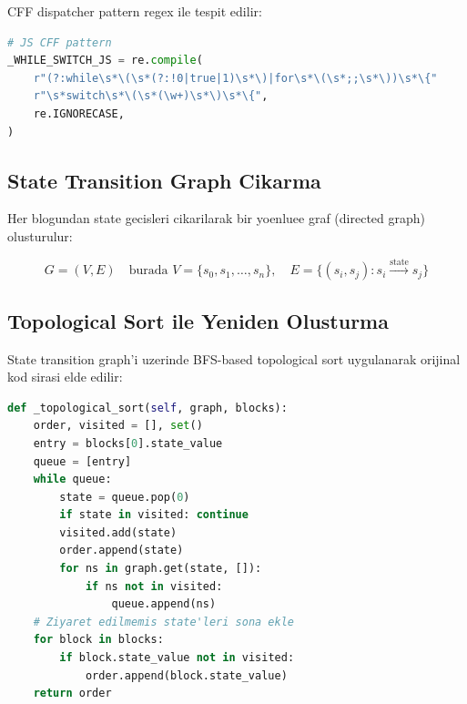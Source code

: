 CFF dispatcher pattern regex ile tespit edilir:

\begin{lstlisting}[language=Python, caption={CFF dispatcher tespiti}]
# JS CFF pattern
_WHILE_SWITCH_JS = re.compile(
    r"(?:while\s*\(\s*(?:!0|true|1)\s*\)|for\s*\(\s*;;\s*\))\s*\{"
    r"\s*switch\s*\(\s*(\w+)\s*\)\s*\{",
    re.IGNORECASE,
)
\end{lstlisting}

\subsection{State Transition Graph Cikarma}

Her  blogundan state gecisleri cikarilarak bir yoenluee graf (directed graph) olusturulur:

\begin{equation}
G = (V, E) \quad \text{burada } V = \{s_0, s_1, \ldots, s_n\}, \quad E = \{(s_i, s_j) : s_i \xrightarrow{\text{state}} s_j\}
\end{equation}

\begin{center}
\end{center}

\subsection{Topological Sort ile Yeniden Olusturma}

State transition graph'i uzerinde BFS-based topological sort uygulanarak orijinal kod sirasi elde edilir:

\begin{lstlisting}[language=Python, caption={Topological sort -- cff\_deflattener.py}]
def _topological_sort(self, graph, blocks):
    order, visited = [], set()
    entry = blocks[0].state_value
    queue = [entry]
    while queue:
        state = queue.pop(0)
        if state in visited: continue
        visited.add(state)
        order.append(state)
        for ns in graph.get(state, []):
            if ns not in visited:
                queue.append(ns)
    # Ziyaret edilmemis state'leri sona ekle
    for block in blocks:
        if block.state_value not in visited:
            order.append(block.state_value)
    return order
\end{lstlisting}

